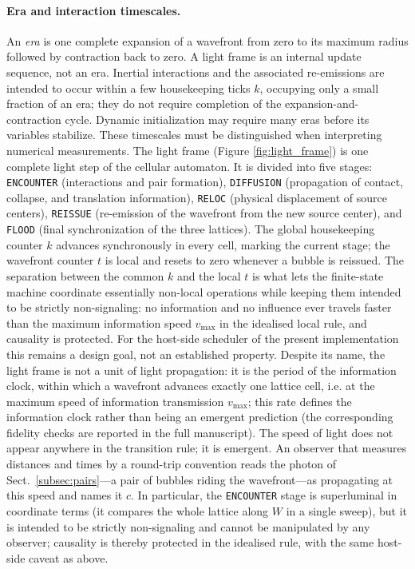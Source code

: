 \documentclass[a4paper]{article}
\begin{document}
\paragraph{Era and interaction timescales.} An \emph{era} is one complete expansion of a wavefront from zero to its maximum radius followed by contraction back to zero. A light frame is an internal update sequence, not an era. Inertial interactions and the associated re-emissions are intended to occur within a few housekeeping ticks $k$, occupying only a small fraction of an era; they do not require completion of the expansion-and-contraction cycle. Dynamic initialization may require many eras before its variables stabilize. These timescales must be distinguished when interpreting numerical measurements.
The light frame (Figure \ref{fig:light_frame}) is one complete light step of the cellular automaton. It is divided into five stages: \texttt{ENCOUNTER} (interactions and pair formation), \texttt{DIFFUSION} (propagation of contact, collapse, and translation information), \texttt{RELOC} (physical displacement of source centers), \texttt{REISSUE} (re-emission of the wavefront from the new source center), and \texttt{FLOOD} (final synchronization of the three lattices). The global housekeeping counter $k$ advances synchronously in every cell, marking the current stage; the wavefront counter $t$ is local and resets to zero whenever a bubble is reissued. The separation between the common $k$ and the local $t$ is what lets the finite-state machine coordinate essentially non-local operations while keeping them intended to be strictly non-signaling: no information and no influence ever travels faster than the maximum information speed $v_{\max}$ in the idealised local rule, and causality is protected.  For the host-side scheduler of the present implementation this remains a design goal, not an established property.
Despite its name, the light frame is not a unit of light propagation: it is the period of the information clock, within which a wavefront advances exactly one lattice cell, i.e. at the maximum speed of information transmission $v_{\max}$; this rate defines the information clock rather than being an emergent prediction (the corresponding fidelity checks are reported in the full manuscript). The speed of light does not appear anywhere in the transition rule; it is emergent. An observer that measures distances and times by a round-trip convention reads the photon of Sect.~\ref{subsec:pairs}---a pair of bubbles riding the wavefront---as propagating at this speed and names it $c$. In particular, the \texttt{ENCOUNTER} stage is superluminal in coordinate terms (it compares the whole lattice along $W$ in a single sweep), but it is intended to be strictly non-signaling and cannot be manipulated by any observer; causality is thereby protected in the idealised rule, with the same host-side caveat as above.
\end{document}
